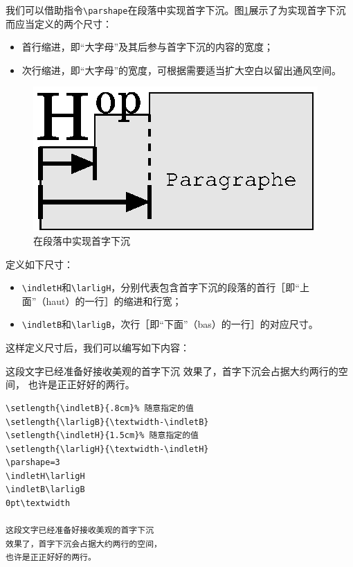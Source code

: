 我们可以借助指令\verb|\parshape|在段落中实现首字下沉。图\ref{fig:11.3}展示了为实现首字下沉而应当定义的两个尺寸：

\begin{itemize}
    \item 首行缩进，即“大字母”及其后参与首字下沉的内容的宽度；
    \item 次行缩进，即“大字母”的宽度，可根据需要适当扩大空白以留出通风空间。
\end{itemize}

\begin{figure}[ht]
    \begin{center}
      \includegraphics{img/lettrine}
    \end{center}
    \caption{在段落中实现首字下沉}
    \label{fig:11.3}
\end{figure}

定义如下尺寸：

\begin{itemize}
\item \verb|\indletH|和\verb|\larligH|，分别代表包含首字下沉的段落的首行［即“上面”（haut）的一行］的缩进和行宽；
\item \verb|\indletB|和\verb|\larligB|，次行［即“下面”（bas）的一行］的对应尺寸。
\end{itemize}

这样定义尺寸后，我们可以编写如下内容：

\begin{codelist}[11/23]{
\newlength{\indletB}
\newlength{\indletH}
\newlength{\larligB}
\newlength{\larligH}
\setlength{\indletB}{.8cm}%
\setlength{\larligB}{\textwidth-\indletB}
\setlength{\indletH}{1.5cm}%
\setlength{\larligH}{\textwidth-\indletH}
\indletH\larligH
\indletB\larligB
0pt\textwidth
这段文字已经准备好接收美观的首字下沉
效果了，首字下沉会占据大约两行的空间，
也许是正正好好的两行。
}\begin{verbatim}
\setlength{\indletB}{.8cm}% 随意指定的值
\setlength{\larligB}{\textwidth-\indletB}
\setlength{\indletH}{1.5cm}% 随意指定的值
\setlength{\larligH}{\textwidth-\indletH}
\parshape=3
\indletH\larligH
\indletB\larligB
0pt\textwidth

这段文字已经准备好接收美观的首字下沉
效果了，首字下沉会占据大约两行的空间，
也许是正正好好的两行。
\end{verbatim}
\end{codelist}

